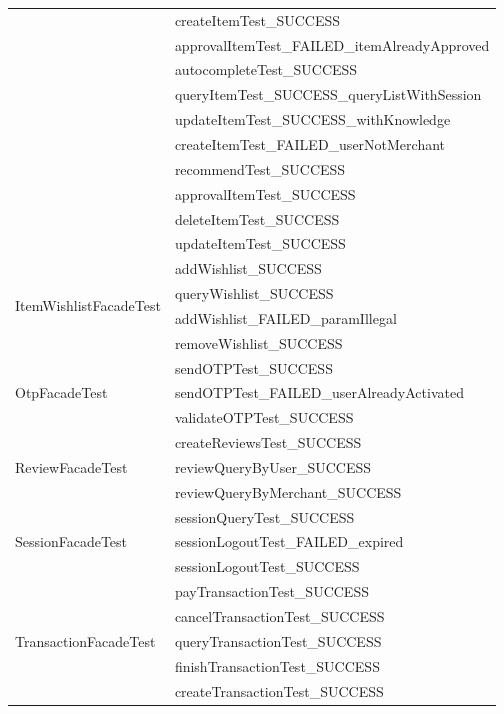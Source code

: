\documentclass[a4paper]{article}
\begin{document}
\begin{enumerate}
\begin{longtable}[c]{|l|l|}
 & createItemTest\_SUCCESS \\ \cline{2-2} 
 & approvalItemTest\_FAILED\_itemAlreadyApproved \\ \cline{2-2} 
 & autocompleteTest\_SUCCESS \\ \cline{2-2} 
 & queryItemTest\_SUCCESS\_queryListWithSession \\ \cline{2-2} 
 & updateItemTest\_SUCCESS\_withKnowledge \\ \cline{2-2} 
 & createItemTest\_FAILED\_userNotMerchant \\ \cline{2-2} 
 & recommendTest\_SUCCESS \\ \cline{2-2} 
 & approvalItemTest\_SUCCESS \\ \cline{2-2} 
 & deleteItemTest\_SUCCESS \\ \cline{2-2} 
 & updateItemTest\_SUCCESS \\ \hline
\multirow{4}{*}{ItemWishlistFacadeTest} & addWishlist\_SUCCESS \\ \cline{2-2} 
 & queryWishlist\_SUCCESS \\ \cline{2-2} 
 & addWishlist\_FAILED\_paramIllegal \\ \cline{2-2} 
 & removeWishlist\_SUCCESS \\ \hline
\multirow{3}{*}{OtpFacadeTest} & sendOTPTest\_SUCCESS \\ \cline{2-2} 
 & sendOTPTest\_FAILED\_userAlreadyActivated \\ \cline{2-2} 
 & validateOTPTest\_SUCCESS \\ \hline
\multirow{3}{*}{ReviewFacadeTest} & createReviewsTest\_SUCCESS \\ \cline{2-2} 
 & reviewQueryByUser\_SUCCESS \\ \cline{2-2} 
 & reviewQueryByMerchant\_SUCCESS \\ \hline
\multirow{3}{*}{SessionFacadeTest} & sessionQueryTest\_SUCCESS \\ \cline{2-2} 
 & sessionLogoutTest\_FAILED\_expired \\ \cline{2-2} 
 & sessionLogoutTest\_SUCCESS \\ \hline
\multirow{5}{*}{TransactionFacadeTest} & payTransactionTest\_SUCCESS \\ \cline{2-2} 
 & cancelTransactionTest\_SUCCESS \\ \cline{2-2} 
 & queryTransactionTest\_SUCCESS \\ \cline{2-2} 
 & finishTransactionTest\_SUCCESS \\ \cline{2-2} 
 & createTransactionTest\_SUCCESS \\ \hline

\end{longtable}
\end{enumerate}
\end{document}
